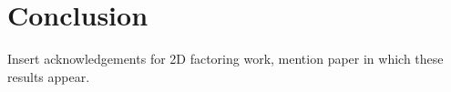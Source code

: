 \section{Conclusion}
\label{sec:fpl-conclude}

Insert acknowledgements for 2D factoring work, mention paper in which these results appear.